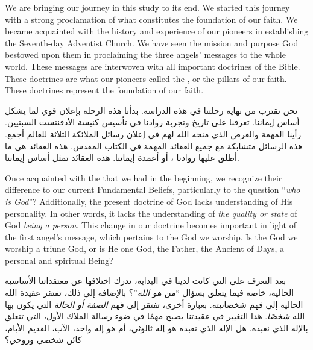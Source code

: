 



We are bringing our journey in this study to its end. We started this journey with a strong proclamation of what constitutes the foundation of our faith. We became acquainted with the history and experience of our pioneers in establishing the Seventh-day Adventist Church. We have seen the mission and purpose God bestowed upon them in proclaiming the three angels’ messages to the whole world. These messages are interwoven with all important doctrines of the Bible. These doctrines are what our pioneers called the , or the pillars of our faith. These doctrines represent the foundation of our faith.


نحن نقترب من نهاية رحلتنا في هذه الدراسة. بدأنا هذه الرحلة بإعلان قوي لما يشكل أساس إيماننا. تعرفنا على تاريخ وتجربة روادنا في تأسيس كنيسة الأدفنتست السبتيين. رأينا المهمة والغرض الذي منحه الله لهم في إعلان رسائل الملائكة الثلاثة للعالم أجمع. هذه الرسائل متشابكة مع جميع العقائد المهمة في الكتاب المقدس. هذه العقائد هي ما أطلق عليها روادنا ، أو أعمدة إيماننا. هذه العقائد تمثل أساس إيماننا.


Once acquainted with the  that we had in the beginning, we recognize their difference to our current Fundamental Beliefs, particularly to the question “\textit{who is God}”? Additionally, the present doctrine of God lacks understanding of His personality. In other words, it lacks the understanding of \textit{the quality or state} of God \textit{being a person}. This change in our doctrine becomes important in light of the first angel’s message, which pertains to the God we worship. Is the God we worship a triune God, or is He one God, the Father, the Ancient of Days, a personal and spiritual Being?


بعد التعرف على  التي كانت لدينا في البداية، ندرك اختلافها عن معتقداتنا الأساسية الحالية، خاصة فيما يتعلق بسؤال “\textit{من هو الله}”؟ بالإضافة إلى ذلك، تفتقر عقيدة الله الحالية إلى فهم شخصانيته. بعبارة أخرى، تفتقر إلى فهم \textit{الصفة أو الحالة} التي يكون بها الله \textit{شخصًا}. هذا التغيير في عقيدتنا يصبح مهمًا في ضوء رسالة الملاك الأول، التي تتعلق بالإله الذي نعبده. هل الإله الذي نعبده هو إله ثالوثي، أم هو إله واحد، الآب، القديم الأيام، كائن شخصي وروحي؟


